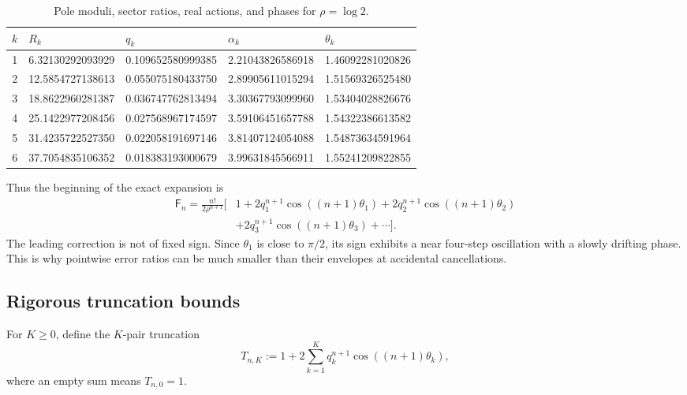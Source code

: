 \documentclass[11pt,a4paper,oneside]{article}
\theoremstyle{definition}
\theoremstyle{remark}
\newcommand{\Fub}{\mathsf{F}}
\begin{document}
\begin{table}[htbp]
\centering
\caption{Pole moduli, sector ratios, real actions, and phases for
$\rho=\log2$.}
\label{tab:actions}
\begin{tabular}{@{}rllll@{}}
\toprule
$k$ & $R_k$ & $q_k$ & $\alpha_k$ & $\theta_k$\\
\midrule
1 & 6.32130292093929 & 0.109652580999385 & 2.21043826586918 & 1.46092281020826\\
2 & 12.5854727138613 & 0.055075180433750 & 2.89905611015294 & 1.51569326525480\\
3 & 18.8622960281387 & 0.036747762813494 & 3.30367793099960 & 1.53404028826676\\
4 & 25.1422977208456 & 0.027568967174597 & 3.59106451657788 & 1.54322386613582\\
5 & 31.4235722527350 & 0.022058191697146 & 3.81407124054088 & 1.54873634591964\\
6 & 37.7054835106352 & 0.018383193000679 & 3.99631845566911 & 1.55241209822855\\
\bottomrule
\end{tabular}
\end{table}

Thus the beginning of the exact expansion is
\begin{align}\label{eq:first-sectors}
 \Fub_n=\frac{n!}{2\rho^{n+1}}\bigl[&1
 +2q_1^{n+1}\cos((n+1)\theta_1)
 +2q_2^{n+1}\cos((n+1)\theta_2)\nonumber\\
 &+2q_3^{n+1}\cos((n+1)\theta_3)+\cdots\bigr].
\end{align}
The leading correction is not of fixed sign.  Since $\theta_1$ is close to
$\pi/2$, its sign exhibits a near four-step oscillation with a slowly drifting
phase.  This is why pointwise error ratios can be much smaller than their
envelopes at accidental cancellations.

\subsection{Rigorous truncation bounds}
For $K\ge0$, define the $K$-pair truncation
\begin{equation}\label{eq:TK}
 T_{n,K}:=1+2\sum_{k=1}^{K}q_k^{n+1}
                   \cos((n+1)\theta_k),
\end{equation}
where an empty sum means $T_{n,0}=1$.
\end{document}
